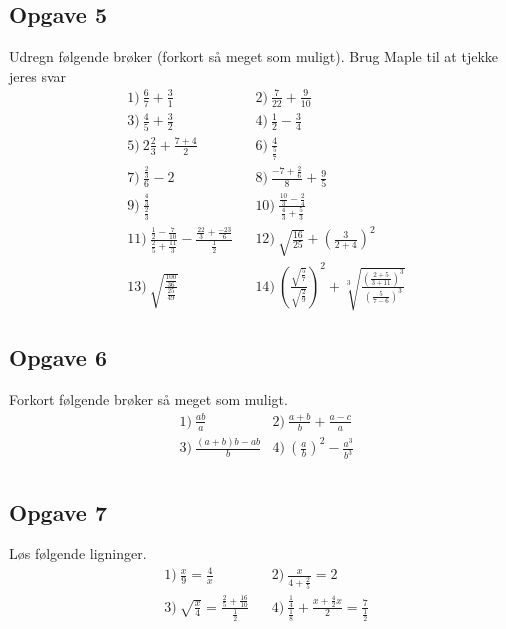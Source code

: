\subsection*{Opgave 5}
Udregn følgende brøker (forkort så meget som muligt). Brug Maple til at tjekke jeres svar
\begin{align*}
	&1)\  \frac{6}{7} + \frac{3}{1}            &&2)\ \frac{7}{22} + \frac{9}{10}\\
 	&3)\ \frac{4}{5} + \frac{3}{2}      &&4)\ \frac{1}{2} - \frac{3}{4}\\
 	&5)\  2\frac{2}{3} + \frac{7+4}{2}              &&6)\ \frac{4}{\frac{5}{7}}\\
 	&7)\  \frac{\frac{2}{3}}{6} - 2           &&8)\ \frac{-7+\frac{2}{6}}{8} + \frac{9}{5}\\
	&9)\ \frac{\frac{4}{3}}{\frac{2}{3}} &&10)\ \frac{\frac{10}{3}-\frac{2}{4}}{\frac{4}{3}+\frac{5}{3}} \\
	&11)\  \frac{\frac{1}{2}-\frac{7}{10}}{\frac{2}{5}+\frac{11}{3}} -  \frac{\frac{22}{3}+ \frac{-23}{6}}{\frac{1}{2}}        &&12)\ \sqrt{\frac{16}{25}} + \left(\frac{3}{2+4}\right)^2\\
	&13)\ \sqrt{\frac{\frac{100}{36}}{\frac{25}{49}}} && 14) \   \left(\frac{\sqrt{\frac{5}{7}}}{\sqrt{\frac{2}{9}}}\right)^2 + \sqrt[3]{\frac{\left(\frac{2+5}{3+11}\right)^3}{\left( \frac{5}{7-6}\right)^3}}
\end{align*}

\subsection*{Opgave 6}
Forkort følgende brøker så meget som muligt. 
\begin{align*}
	&1) \ \frac{ab}{a}   &2) \  \frac{a+b}{b} + \frac{a-c}{a}    \\
	&3) \ \frac{(a+b)b-ab}{b}   &4) \  \left(\frac{a}{b}\right)^2 - \frac{a^3}{b^3}   \\
\end{align*}

\subsection*{Opgave 7}
Løs følgende ligninger.
\begin{align*}
	&1) \ \frac{x}{9} = \frac{4}{x}   &&2) \ \frac{x}{4+\frac{2}{5}} = 2     \\
	&3) \ \sqrt{\frac{x}{4}} = \frac{\frac{2}{5}+\frac{16}{10}}{\frac{1}{2}}    &&4) 
	\ \frac{\frac{1}{4}}{\frac{1}{8}} + \frac{x+\frac{4}{2}x}{2} = \frac{7}{\frac{1}{2}}    \\
\end{align*}

